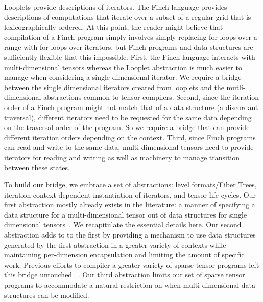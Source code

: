 Looplets provide descriptions of iterators. 
%
The Finch language provides descriptions of computations that iterate over a subset of a regular grid that is lexicographically ordered.
%
At this point, the reader might believe that compilation of a Finch program simply involves simply replacing for loops over a range with for loops over iterators, but Finch programs and data structures are sufficiently flexible that this impossible.
%
First, the Finch language interacts with multi-dimensional tensors whereas the Looplet abstraction is much easier to manage when considering a single dimensional iterator. 
%
We require a bridge between the single dimensional iterators created from looplets and the mutli-dimensional abstractions common to tensor compilers.
%
Second, since the iteration order of a Finch program might not match that of a data structure (a discordant traversal), different iterators need to be requested for the same data depending on the traversal order of the program.
%
So we require a bridge that can provide different iteration orders depending on the context.
%
Third, since Finch programs can read and write to the same data, multi-dimensional tensors need to provide iterators for reading and writing as well as machinery to manage transition between these states.

To build our bridge, we embrace a set of abstractions: level formats/Fiber Trees, iteration context dependent instantiation of iterators, and tensor life cycles.
%
Our first abstraction mostly already exists in the literature: a manner of specifying a data structure for a multi-dimensional tensor out of data structures for single dimensional tensors~\cite{sze2017efficient,chou2022compilation, chou2018format}. 
%
We recapitulate the essential details here.
%
Our second abstraction adds to to the first by providing a mechanism to use data structures generated by the first abstraction in a greater variety of contexts while maintaining per-dimension encapsulation and limiting the amount of specific work.
%
Previous efforts to compiler a greater variety of sparse tensor programs left this bridge untouched ~\cite{henry2021compilation, won2023unified}.
%
Our third abstraction limits our set of sparse tensor programs to accommodate a natural restriction on when multi-dimensional data structures can be modified.
%


